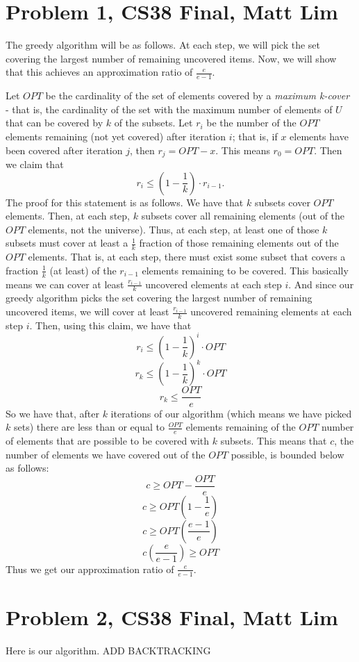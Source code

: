 \documentclass{article}
\begin{document}
\section*{Problem 1, CS38 Final, Matt Lim}
The greedy algorithm will be as follows. At each step, we will pick the set
covering the largest number of remaining uncovered items. Now, we will show that
this achieves an approximation ratio of $\frac{e}{e-1}$.

Let $OPT$ be the cardinality of the set of elements covered by a
\textit{maximum k-cover} - that is, the cardinality of the set
with the maximum number of elements of $U$ that can be covered by $k$ of the
subsets. Let $r_i$ be the number of the $OPT$ elements remaining (not yet
covered) after iteration $i$; that is, if $x$ elements have been covered after
iteration $j$, then $r_j = OPT - x$. This means $r_0 = OPT$. Then we claim that
\[ r_i \leq (1 - \frac{1}{k}) \cdot r_{i-1}. \]
The proof for this statement is as follows. We have
that $k$ subsets cover $OPT$ elements. Then, at each step, $k$ subsets cover
all remaining elements (out of the $OPT$ elements, not the universe).
Thus, at each step, at least one of those $k$ subsets must cover at least a $\frac{1}{k}$
fraction of those remaining elements out of the $OPT$ elements. That is, at
each step, there
must exist some subset that covers a fraction $\frac{1}{k}$ (at least) of the $r_{i-1}$
elements remaining to be covered. This basically means we can cover at least
$\frac{r_{i-1}}{k}$ uncovered elements at each step $i$. And since our
greedy algorithm picks the set covering the largest number of remaining
uncovered items, we will cover at least $\frac{r_{i-1}}{k}$ uncovered remaining
elements at each step $i$. Then, using this claim, we have that
\[ r_i \leq (1 - \frac{1}{k})^i \cdot OPT \]
\[ r_k \leq (1 - \frac{1}{k})^k \cdot OPT \]
\[ r_k \leq \frac{OPT}{e} \]
So we have that, after $k$ iterations of our algorithm (which means we have
picked $k$ sets) there are less than or equal to $\frac{OPT}{e}$ elements
remaining of the $OPT$ number of elements that are possible to be covered with
$k$ subsets. This means that $c$, the number of elements we have
covered out of the $OPT$ possible, is bounded below as follows:
\[ c \geq OPT - \frac{OPT}{e} \]
\[ c \geq OPT(1 - \frac{1}{e}) \]
\[ c \geq OPT(\frac{e-1}{e}) \]
\[ c(\frac{e}{e-1}) \geq OPT \]
Thus we get our approximation ratio of $\frac{e}{e-1}$.
\newpage

\section*{Problem 2, CS38 Final, Matt Lim}
Here is our algorithm. ADD BACKTRACKING
\end{document}
